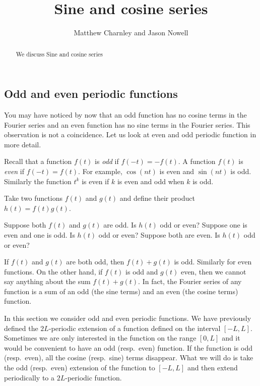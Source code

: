 \documentclass{ximera}
\title{Sine and cosine series}
\author{Matthew Charnley and Jason Nowell}
\begin{document}
\begin{abstract}
    We discuss Sine and cosine series
\end{abstract}
\maketitle


\label{sec:scs}




\subsection{Odd and even periodic functions}

You may have noticed by now that an odd function has no cosine terms in the Fourier series and an even function has no sine terms in the Fourier series. This observation is not a coincidence.  Let us look at even and odd periodic function in more detail.

Recall that a function $f(t)$ is \emph{odd} if $f(-t) = -f(t)$.  A function $f(t)$ is \emph{even} if $f(-t) = f(t)$.  For example, $\cos (n t)$ is even and $\sin (n t)$ is odd. Similarly the function $t^k$ is even if $k$ is even and odd when $k$ is odd.

\begin{exercise}
    Take two functions $f(t)$ and $g(t)$ and define their product $h(t) = f(t)g(t)$.
    \begin{tasks}
        \task Suppose both $f(t)$ and $g(t)$ are odd.  Is $h(t)$ odd or even?
        \task Suppose one is even and one is odd.  Is $h(t)$ odd or even?
        \task Suppose both are even.  Is $h(t)$ odd or even?
    \end{tasks}
\end{exercise}

If $f(t)$ and $g(t)$ are both odd, then $f(t)+g(t)$ is odd.  Similarly for even functions.  On the other hand, if $f(t)$ is odd and $g(t)$ even, then we cannot say anything about the sum $f(t) + g(t)$.  In fact, the Fourier series of any function is a sum of an odd (the sine terms) and an even (the cosine terms) function.

In this section we consider odd and even periodic functions.  We have previously defined the $2L$-periodic extension of a function defined on the interval $[-L,L]$.  Sometimes we are only interested in the function on the range $[0,L]$ and it would be convenient to have an odd (resp.\ even) function.  If the function is odd (resp.\ even), all the cosine (resp.\ sine) terms disappear. What we will do is take the odd (resp.\ even) extension of the function to $[-L,L]$ and then extend periodically to a $2L$-periodic function.
\end{document}
